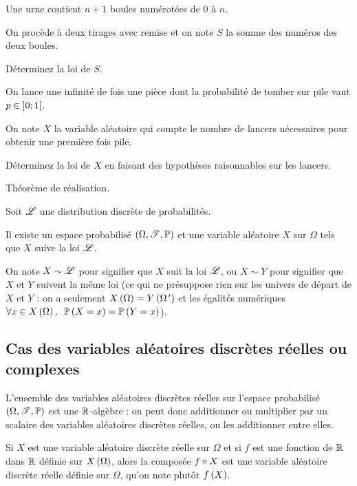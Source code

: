 \begin{exo}
Une urne contient \(n+1\) boules numérotées de \(0\) à \(n\).

On procède à deux tirages avec remise et on note \(S\) la somme des numéros des deux boules.

Déterminez la loi de \(S\).
\end{exo}

\begin{exo}
On lance une infinité de fois une pièce dont la probabilité de tomber sur pile vaut \(p\in\left]0;1\right[\).

On note \(X\) la variable aléatoire qui compte le nombre de lancers nécessaires pour obtenir une première fois pile.

Déterminez la loi de \(X\) en faisant des hypothèses raisonnables sur les lancers.
\end{exo}

Théorème de réalisation.

\begin{theo}
Soit \(\mathscr{L}\) une distribution discrète de probabilités.

Il existe un espace probabilisé \(\anneau{\Omega}[\fami{T}][\prem]\) et une variable aléatoire \(X\) sur \(\Omega\) tels que \(X\) suive la loi \(\mathscr{L}\).
\end{theo}

On note \(X\sim\mathscr{L}\) pour signifier que \(X\) suit la loi \(\mathscr{L}\), ou \(X\sim Y\) pour signifier que \(X\) et \(Y\) suivent la même loi (ce qui ne présuppose rien sur les univers de départ de \(X\) et \(Y\) : on a seulement \(X\left(\Omega\right)=Y\left(\Omega^{\,\prime}\right)\) et les égalités numériques \(\quantifs{\forall x\in X\paren{\Omega}}\proba{X=x}=\proba{Y=x}\)).

\subsection{Cas des variables aléatoires discrètes réelles ou complexes}

\begin{prop}
L'ensemble des variables aléatoires discrètes réelles sur l'espace probabilisé \(\anneau{\Omega}[\fami{T}][\prem]\) est une \(\mathbb{R}\)-algèbre : on peut donc additionner ou multiplier par un scalaire des variables aléatoires discrètes réelles, ou les additionner entre elles.

Si \(X\) est une variable aléatoire discrète réelle sur \(\Omega\) et si \(f\) est une fonction de \(\mathbb{R}\) dans \(\mathbb{R}\) définie sur \(X\left(\Omega\right)\), alors la composée \(f\circ X\) est une variable aléatoire discrète réelle définie sur \(\Omega\), qu'on note plutôt \(f\left(X\right)\).
\end{prop}

